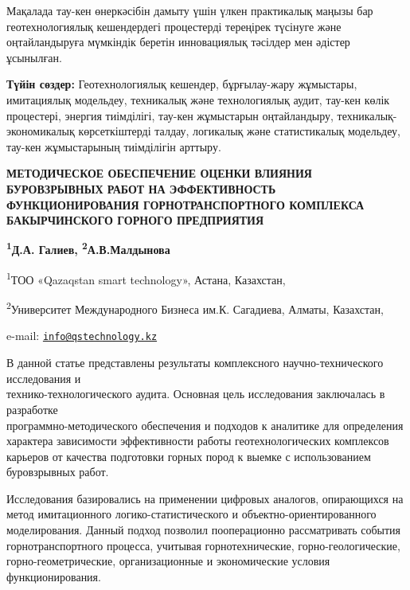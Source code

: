 Мақалада тау-кен өнеркәсібін дамыту үшін үлкен практикалық маңызы бар
геотехнологиялық кешендердегі процестерді тереңірек түсінуге және
оңтайландыруға мүмкіндік беретін инновациялық тәсілдер мен әдістер
ұсынылған.

{\bfseries Түйін сөздер:} Геотехнологиялық кешендер, бұрғылау-жару
жұмыстары, имитациялық модельдеу, техникалық және технологиялық аудит,
тау-кен көлік процестері, энергия тиімділігі, тау-кен жұмыстарын
оңтайландыру, техникалық-экономикалық көрсеткіштерді талдау, логикалық
және статистикалық модельдеу, тау-кен жұмыстарының тиімділігін арттыру.

\begin{articleheader}
{\bfseries МЕТОДИЧЕСКОЕ ОБЕСПЕЧЕНИЕ ОЦЕНКИ ВЛИЯНИЯ БУРОВЗРЫВНЫХ РАБОТ НА
ЭФФЕКТИВНОСТЬ ФУНКЦИОНИРОВАНИЯ ГОРНОТРАНСПОРТНОГО КОМПЛЕКСА
БАКЫРЧИНСКОГО ГОРНОГО ПРЕДПРИЯТИЯ}

{\bfseries
\textsuperscript{1}Д.А. Галиев\textsuperscript{\envelope },
\textsuperscript{2}А.В.Малдынова
}
\end{articleheader}

\begin{affiliation}
\textsuperscript{1}ТОО «Qazaqstan smart technology», Астана, Казахстан,
                   
\textsuperscript{2}Университет Международного Бизнеса им.К. Сагадиева, Алматы, Казахстан,

e-mail: \href{mailto:info@qstechnology.kz}{\nolinkurl{info@qstechnology.kz}}
\end{affiliation}

В данной статье представлены результаты комплексного научно-технического
исследования и \\технико-технологического аудита. Основная цель
исследования заключалась в разработке \\программно-методического
обеспечения и подходов к аналитике для определения характера зависимости
эффективности работы геотехнологических комплексов карьеров от качества
подготовки горных пород к выемке с использованием буровзрывных работ.

Исследования базировались на применении цифровых аналогов, опирающихся
на метод имитационного логико-статистического и
объектно-ориентированного моделирования. Данный подход позволил
пооперационно рассматривать события горнотранспортного процесса,
учитывая горнотехнические, горно-геологические, горно-геометрические,
организационные и экономические условия \\функционирования.

